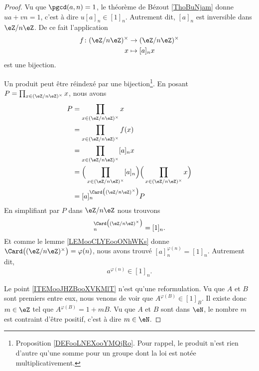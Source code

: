 \begin{proof}
	Vu que \( \pgcd(a,n)=1\), le théorème de Bézout \ref{ThoBuNjam} donne \( ua+vn=1\), c'est à dire \( u[a]_n\in [1]_n\). Autrement dit, \( [a]_n\) est inversible dans \( \eZ/n\eZ\). De ce fait l'application
	\begin{equation}
		\begin{aligned}
			f\colon (\eZ/n\eZ)^{\times} & \to (\eZ/n\eZ)^{\times} \\
			x                           & \mapsto [a]_nx
		\end{aligned}
	\end{equation}
	est une bijection.

	Un produit peut être réindexé par une bijection\footnote{Proposition \ref{DEFooLNEXooYMQjRo}. Pour rappel, le produit n'est rien d'autre qu'une somme pour un groupe dont la loi est notée multiplicativement.}. En posant \( P=\prod_{x\in (\eZ/n\eZ)^{\times}}x\), nous avons
	\begin{subequations}
		\begin{align}
			P & =\prod_{x\in (\eZ/n\eZ)^{\times}}x                                                                \\
			  & =  \prod_{x\in (\eZ/n\eZ)^{\times}}f(x)                                                           \\
			  & =\prod_{x\in (\eZ/n\eZ)^{\times}}[a]_nx                                                           \\
			  & =\Big( \prod_{x\in (\eZ/n\eZ)^{\times}} [a]_n \Big)\Big( \prod_{x\in (\eZ/n\eZ)^{\times}} x \Big) \\
			  & =[a]_n^{\Card\big( (\eZ/n\eZ)^{\times} \big)}P
		\end{align}
	\end{subequations}
	En simplifiant par \( P\) dans \( \eZ/n\eZ\) nous trouvons
	\begin{equation}
		[a]_n^{\Card\big( (\eZ/n\eZ)^{\times} \big)}=[1]_n.
	\end{equation}
	Et comme le lemme \ref{LEMooCLYEooONhWKs} donne \( \Card\big( (\eZ/n\eZ)^{\times} \big)=\varphi(n)\), nous avons trouvé \( [a]_n^{\varphi(n)}=[1]_n\). Autrement dit,
	\begin{equation}
		a^{\varphi(n)}\in [1]_n.
	\end{equation}

	Le point \ref{ITEMooJHZBooXVKMlT} n'est qu'une reformulation. Vu que \( A\) et \( B\) sont premiers entre eux, nous venons de voir que \( A^{\varphi(B)}\in [1]_B\). Il existe donc \( m\in \eZ\) tel que \( A^{\varphi(B)}=1+mB\). Vu que \( A\) et \( B\) sont dans \( \eN\), le nombre \( m\) est contraint d'être positif, c'est à dire \( m\in \eN\).
\end{proof}



